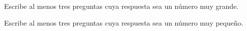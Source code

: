 \documentclass[12pt]{exam}
\begin{document}
\begin{questions}

    \question Escribe al menos tres preguntas cuya respuesta sea un número muy grande.

    \question Escribe al menos tres preguntas cuya respuesta sea un número muy pequeño.

\end{questions}
\end{document}
